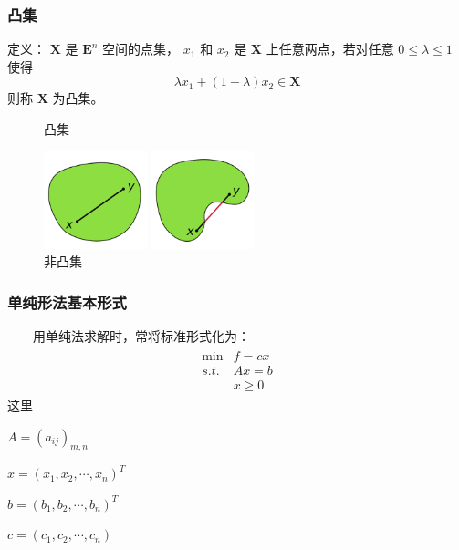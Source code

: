 \documentclass[slidestop,compress,mathserif,c]{beamer}
\begin{document}
\begin{frame}
\frametitle{凸集}
定义： $ \mathbf{X} $ 是 $ \mathbf{E}^n $  空间的点集， $ x_1 $  和 $ x_2 $ 是 $ \mathbf{X} $ 上任意两点，若对任意 $ 0\leq\lambda\leq1 $ 使得 $$ \lambda x_1+(1-\lambda)x_2\in \mathbf{X} $$ 
则称 $ \mathbf{X} $ 为凸集。
\begin{center}
  \begin{figure}[htbp]
    \begin{minipage}{0.4\textwidth}
    \caption{凸集}
    \includegraphics[width=3cm]{tuji.png}
  \end{minipage}
    \begin{minipage}{0.4\textwidth}
    \caption{非凸集}
    \includegraphics[width=3cm]{feituji.png}
  \end{minipage}
  \end{figure}
\end{center}
\end{frame}

\begin{frame}
\frametitle{单纯形法基本形式}
~~~~用单纯法求解时，常将标准形式化为：
\begin{eqnarray*}
  \begin{array}{cc}
  \min & f=cx\\
  s.t.&
    Ax=b\\
    &x\geq0
  \end{array}
\end{eqnarray*}
这里
\begin{center}
 $ A=(a_{ij})_{m,n} $ 

 $ x=(x_1,x_2,\cdots,x_n)^T $ 

 $ b=(b_1,b_2,\cdots,b_n)^T $ 

 $ c=(c_1,c_2,\cdots,c_n) $ 
\end{center}
\end{frame}
\end{document}
